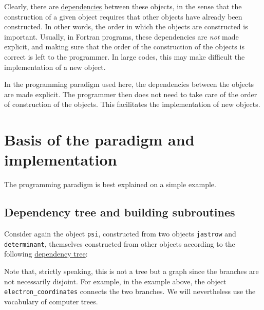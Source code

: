 \documentclass[a4paper,11pt]{article}
\newcommand\Def[1]{\underline{#1}}
\begin{document}
Clearly, there are \Def{dependencies} between these objects, in the sense that the construction of a given object requires that other objects have already been constructed. In other words, the order in which the objects are constructed is important. Usually, in Fortran programs, these dependencies are {\it not} made explicit, and making sure that the order of the construction of the objects is correct is left to the programmer. In large codes, this may make difficult the implementation of a new object.

In the programming paradigm used here, the dependencies between the objects are made explicit. The programmer then does not need to take care of the order of construction of the objects. This facilitates the implementation of new objects.

\section{Basis of the paradigm and implementation}

The programming paradigm is best explained on a simple example. 

\subsection{Dependency tree and building subroutines}

Consider again the object {\tt psi}, constructed from two objects {\tt jastrow} and {\tt determinant}, themselves constructed from other objects according to the following \Def{dependency tree}:


\begin{center}
\end{center}

Note that, strictly speaking, this is not a tree but a graph since the branches are not necessarily disjoint. For example, in the example above, the object {\tt electron_coordinates} connects the two branches. We will nevertheless use the vocabulary of computer trees.
\end{document}

